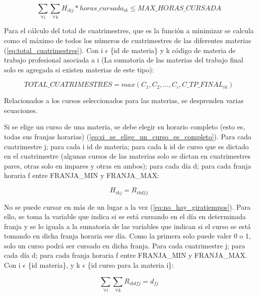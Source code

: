 \documentclass[a4paper]{article}
\begin{document}
\begin{equation}\label{eq:max_horas_cursada}
\sum_{\forall i} \sum_{\forall k} H_{ikj} * horas\_cursada_{ik} \leq MAX\_HORAS\_CURSADA
\end{equation}

Para el cálculo del total de cuatrimestres, que es la función a minimizar se calcula como el máximo de todos los números de cuatrimestres de las diferentes materias (\ref{eq:total_cuatrimestres}). Con i $\epsilon$ \{id de materia\} y k código de materia de trabajo profesional asociada a i (La sumatoria de las materias del trabajo final solo es agregada si existen materias de este tipo):

\begin{equation}\label{eq:total_cuatrimestres}
TOTAL\_CUATRIMESTRES = max(C_1, C_2, ..., C_i, C\_TP\_FINAL_{ik})
\end{equation}

Relacionados a los cursos seleccionados para las materias, se desprenden varias ecuaciones.

Si se elige un curso de una materia, se debe elegir su horario completo (esto es, todas sus franjas horarias) (\ref{eq:si_se_elige_un_curso_es_completo}). Para cada cuatrimestre j; para cada i id de materia; para cada k id de curso que es dictado en el cuatrimestre (algunas cursos de las materias solo se dictan en cuatrimestres pares, otras solo en impares y otras en ambos); para cada día d; para cada franja horaria f entre FRANJA\_MIN y FRANJA\_MAX:

\begin{equation}\label{eq:si_se_elige_un_curso_es_completo}
H_{ikj} = R_{ikdfj}
\end{equation}

No se puede cursar en más de un lugar a la vez (\ref{eq:no_hay_giratiempos}). Para ello, se toma la variable que indica si se está cursando en el día en determinada franja y se lo iguala a la sumatoria de las variables que indican si el curso se está tomando en dicha franja horaria ese día. Como la primera solo puede valer 0 o 1, solo un curso podrá ser cursado en dicha franja. Para cada cuatrimestre j; para cada día d; para cada franja horaria f entre FRANJA\_MIN y FRANJA\_MAX. Con i $\epsilon$ \{id materia\}, y k $\epsilon$ \{id curso para la materia i\}:

\begin{equation}\label{eq:no_hay_giratiempos}
\sum_{\forall i} \sum_{\forall k} R_{ikdfj} = d_{fj}
\end{equation}
\end{document}
